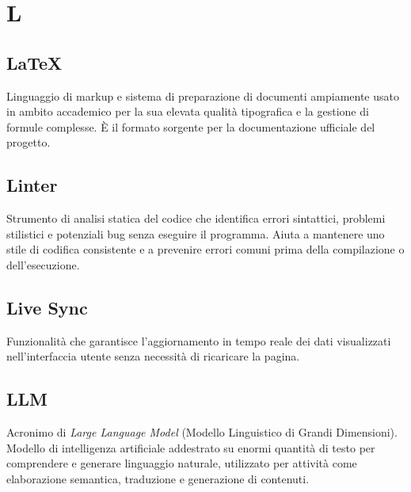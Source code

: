 \documentclass[a4paper, 11pt, oneside]{scrartcl} %
\begin{document}

\section*{L}


\subsection*{LaTeX}


Linguaggio di markup e sistema di preparazione di documenti ampiamente usato in ambito accademico per la sua elevata qualità tipografica e la gestione di formule complesse. È il formato sorgente per la documentazione ufficiale del progetto.

\vspace{0.5cm}

\subsection*{Linter}
Strumento di analisi statica del codice che identifica errori sintattici, problemi stilistici e potenziali bug senza eseguire il programma. Aiuta a mantenere uno stile di codifica consistente e a prevenire errori comuni prima della compilazione o dell'esecuzione.
\vspace{0.5cm}

\subsection*{Live Sync}
Funzionalità che garantisce l'aggiornamento in tempo reale dei dati visualizzati nell'interfaccia utente senza necessità di ricaricare la pagina.
\vspace{0.5cm}

\subsection*{LLM}
Acronimo di \textit{Large Language Model} (Modello Linguistico di Grandi Dimensioni). Modello di intelligenza artificiale addestrato su enormi quantità di testo per comprendere e generare linguaggio naturale, utilizzato per attività come elaborazione semantica, traduzione e generazione di contenuti.
\vspace{0.5cm}
\end{document}
